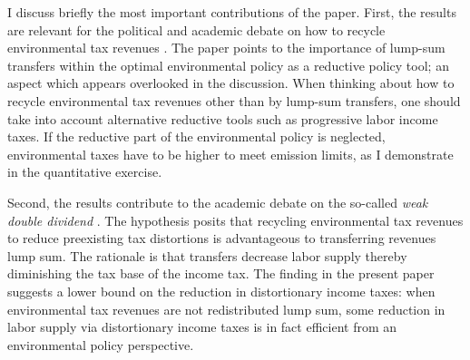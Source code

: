 I discuss briefly the most important contributions of the paper.
First, the results are relevant for the political and academic debate on how  to recycle environmental tax revenues %
 \citep[e.g.][]{Baker2017TheDividends, Fried2018ClimateAnalysis, Carattini2018}. The paper points to the importance of lump-sum transfers within the optimal environmental policy as a reductive policy tool; an aspect which appears overlooked in the discussion. %
When thinking about how to recycle environmental tax revenues other than by lump-sum transfers,  one should take into account alternative reductive tools such as progressive labor income taxes. 
If the reductive part of the environmental policy is neglected, environmental taxes have to be higher to meet emission limits, as I demonstrate in the quantitative exercise.

Second, the results contribute to the academic debate on the so-called \textit{weak double dividend} \citep[for example:][]{LansBovenberg1994EnvironmentalTaxation, LansBovenberg1996OptimalAnalyses}. The hypothesis posits that recycling environmental tax revenues to reduce preexisting tax distortions is advantageous to transferring  revenues lump sum. The rationale is that transfers decrease labor supply thereby diminishing the tax base of the income tax. %
The finding in the present paper suggests a lower bound on the reduction in distortionary income taxes: when environmental tax revenues are not redistributed lump sum, some reduction in labor supply via distortionary income taxes is in fact efficient from an environmental policy perspective. %

